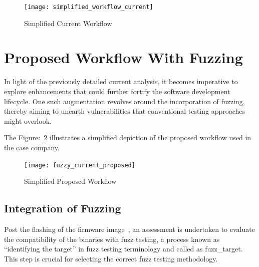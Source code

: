 \begin{figure}[H]
\centering
{}
{\texttt{[image: simplified\_workflow\_current]}}
\caption{Simplified Current Workflow}
\label{fig:simplified_workflow_current}
\end{figure}

\section{Proposed Workflow With Fuzzing}
In light of the previously detailed current analysis, it becomes imperative to
explore enhancements that could further fortify the software development
lifecycle. One such augmentation revolves around the incorporation of
fuzzing, thereby aiming to unearth vulnerabilities
that conventional testing approaches might overlook.

The Figure:~\ref{fig:simplified_workflow_proposed} illustrates a simplified depiction of the
proposed workflow used in the case company.
\begin{figure}[H]
\centering
{}
{\texttt{[image: fuzzy\_current\_proposed]}}
\caption{Simplified Proposed Workflow}
\label{fig:simplified_workflow_proposed}
\end{figure}

\subsection*{Integration of Fuzzing}

Post the flashing of the firmware image~\cite{Firmware14:online}, an assessment
is undertaken to evaluate the compatibility of the binaries with fuzz testing, a process known as
``identifying the target'' in fuzz testing terminology and called as \gls{fuzz_target}.
This step is crucial for selecting the correct fuzz testing methodology.

